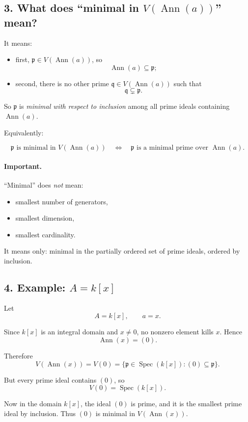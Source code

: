\documentclass[12pt,a4paper]{article}
\theoremstyle{notespace}
\DeclareMathOperator{\Spec}{Spec}
\DeclareMathOperator{\Ann}{Ann}
\begin{document}
\subsection{3. What does ``minimal in \(V(\Ann(a))\)'' mean?}

It means:

\begin{itemize}
	\item first, \(\mathfrak p\in V(\Ann(a))\), so
	\[
	\Ann(a)\subseteq \mathfrak p;
	\]
	\item second, there is no other prime \(\mathfrak q\in V(\Ann(a))\) such that
	\[
	\mathfrak q\subsetneq \mathfrak p.
	\]
\end{itemize}

So \(\mathfrak p\) is \emph{minimal with respect to inclusion} among all prime ideals containing \(\Ann(a)\).

Equivalently:

\[
\mathfrak p \text{ is minimal in } V(\Ann(a))
\quad\Longleftrightarrow\quad
\mathfrak p \text{ is a minimal prime over } \Ann(a).
\]

\paragraph{Important.}
``Minimal'' does \emph{not} mean:
\begin{itemize}
	\item smallest number of generators,
	\item smallest dimension,
	\item smallest cardinality.
\end{itemize}

It means only: minimal in the partially ordered set of prime ideals, ordered by inclusion.

\subsection{4. Example: \(A=k[x]\)}

Let
\[
A=k[x],
\qquad
a=x.
\]

Since \(k[x]\) is an integral domain and \(x\neq 0\), no nonzero element kills \(x\). Hence
\[
\Ann(x)=(0).
\]

Therefore
\[
V(\Ann(x))=V(0)=\{\mathfrak p\in \Spec(k[x]): (0)\subseteq \mathfrak p\}.
\]

But every prime ideal contains \((0)\), so
\[
V(0)=\Spec(k[x]).
\]

Now in the domain \(k[x]\), the ideal \((0)\) is prime, and it is the smallest prime ideal by inclusion. Thus \((0)\) is minimal in \(V(\Ann(x))\).
\end{document}
